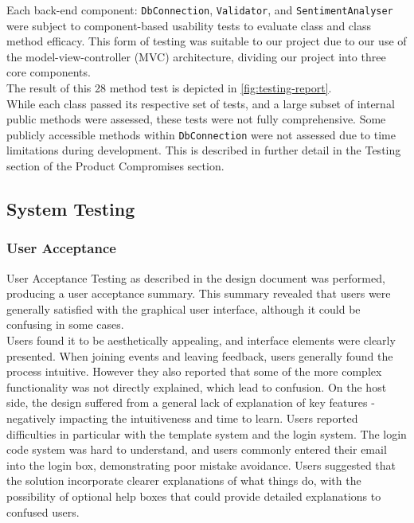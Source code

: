\documentclass[9pt, titlepage]{extarticle}
\begin{document}
Each back-end component: \texttt{DbConnection}, \texttt{Validator}, and \texttt{SentimentAnalyser} were subject to component-based usability tests to evaluate class and class method efficacy. This form of testing was suitable to our project due to our use of the model-view-controller (MVC) architecture, dividing our project into three core components. \\

The result of this 28 method test is depicted in \autoref{fig:testing-report}. \\

While each class passed its respective set of tests, and a large subset of internal public methods were assessed, these tests were not fully comprehensive. Some publicly accessible methods within \texttt{DbConnection} were not assessed due to time limitations during development. This is described in further detail in the Testing section of the Product Compromises section.

\subsection{System Testing}

\subsubsection{User Acceptance}
User Acceptance Testing as described in the design document \cite{design-and-planning} was performed, producing a user acceptance summary. This summary revealed that users were generally satisfied with the graphical user interface, although it could be confusing in some cases.\\

Users found it to be aesthetically appealing, and interface elements were clearly presented. When joining events and leaving feedback, users generally found the process intuitive. However they also reported that some of the more complex functionality was not directly explained, which lead to confusion. On the host side, the design suffered from a general lack of explanation of key features - negatively impacting the intuitiveness and time to learn. Users reported difficulties in particular with the template system and the login system. The login code system was hard to understand, and users commonly entered their email into the login box, demonstrating poor mistake avoidance. Users suggested that the solution incorporate clearer explanations of what things do, with the possibility of optional help boxes that could provide detailed explanations to confused users.
\end{document}

